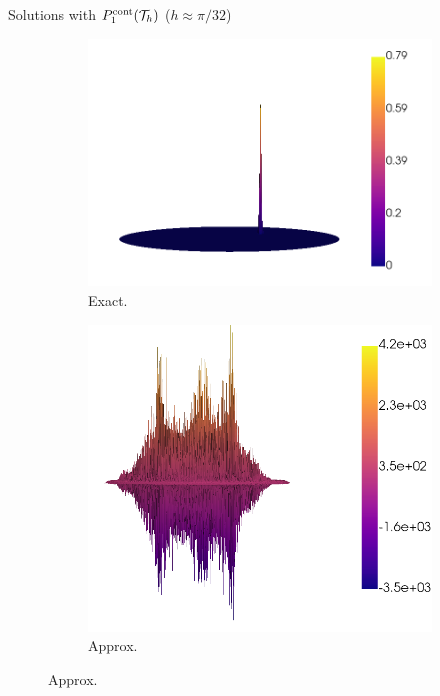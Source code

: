 \begin{frame}{Solutions with $\relax{P}^{\text{cont}}_1(\mathcal{T}_h)$ ($h\approx \pi/32$)}
	\begin{figure}[h!]
		\begin{subfigure}{0.49\textwidth}
			\centering
			\includegraphics[scale=0.23]{img/Conveccion_Reaccion/strong/conv_react_u_ex_nx-64.png}
			\caption{Exact.}
		\end{subfigure}
		\begin{subfigure}{0.49\textwidth}
			\centering
			\includegraphics[scale=0.23]{img/Conveccion_Reaccion/strong/conv_react_u_FE_nx-64.png}
			\caption{Approx.}
		\end{subfigure}
	\end{figure}
	\end{frame}
